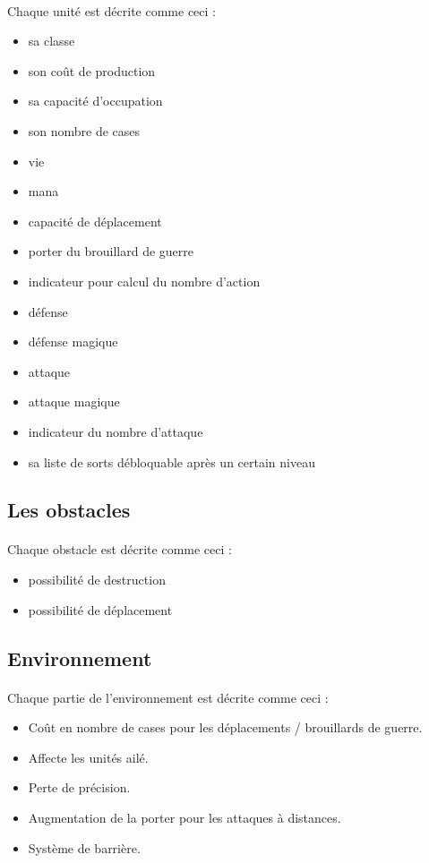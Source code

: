 \paragraph{} Chaque unité est décrite comme ceci :
\begin{itemize}
	\item sa classe
	\item son coût de production
	\item sa capacité d'occupation
	\item son nombre de cases
	\item vie
	\item mana
	\item capacité de déplacement
	\item porter du brouillard de guerre
	\item indicateur pour calcul du nombre d'action
	\item défense
	\item défense magique
	\item attaque
	\item attaque magique
	\item indicateur du nombre d'attaque
	\item sa liste de sorts débloquable après un certain niveau
\end{itemize}

\subsection{Les obstacles}

\paragraph{} Chaque obstacle est décrite comme ceci :
\begin{itemize}
	\item possibilité de destruction
	\item possibilité de déplacement
\end{itemize}

\subsection{Environnement}

\paragraph{} Chaque partie de l'environnement est décrite comme ceci :
\begin{itemize}
	\item Coût en nombre de cases pour les déplacements / brouillards de guerre.
	\item Affecte les unités ailé.
	\item Perte de précision.
	\item Augmentation de la porter pour les attaques à distances.
	\item Système de barrière.
\end{itemize}

